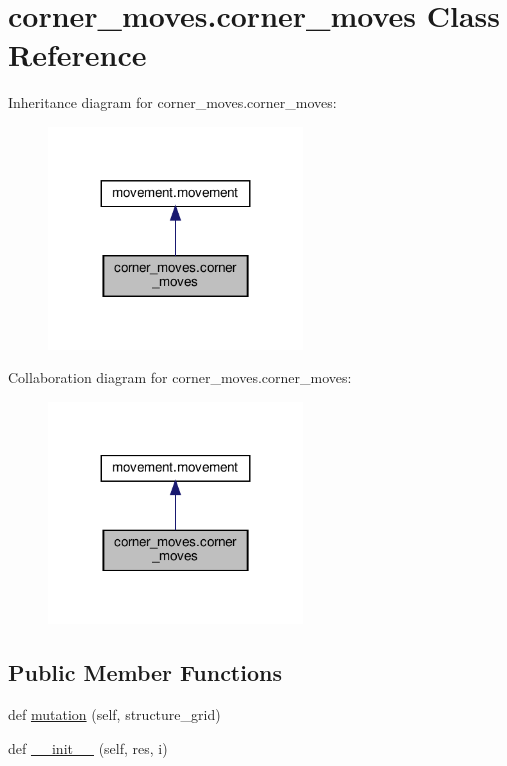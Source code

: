 \hypertarget{classcorner__moves_1_1corner__moves}{}\section{corner\+\_\+moves.\+corner\+\_\+moves Class Reference}
\label{classcorner__moves_1_1corner__moves}


Inheritance diagram for corner\+\_\+moves.\+corner\+\_\+moves\+:
\nopagebreak
\begin{figure}[H]
\begin{center}
\leavevmode
\includegraphics[width=191pt]{classcorner__moves_1_1corner__moves__inherit__graph}
\end{center}
\end{figure}


Collaboration diagram for corner\+\_\+moves.\+corner\+\_\+moves\+:
\nopagebreak
\begin{figure}[H]
\begin{center}
\leavevmode
\includegraphics[width=191pt]{classcorner__moves_1_1corner__moves__coll__graph}
\end{center}
\end{figure}
\subsection*{Public Member Functions}
\begin{DoxyCompactItemize}
\item 
def \hyperlink{classcorner__moves_1_1corner__moves_ab52986603fbba7dfcf7d7a824fee483e}{mutation} (self, structure\+\_\+grid)
\item 
def \hyperlink{classcorner__moves_1_1corner__moves_a71da897f349e236a2b89ce47d6f71a75}{\+\_\+\+\_\+init\+\_\+\+\_\+} (self, res, i)
\end{DoxyCompactItemize}
